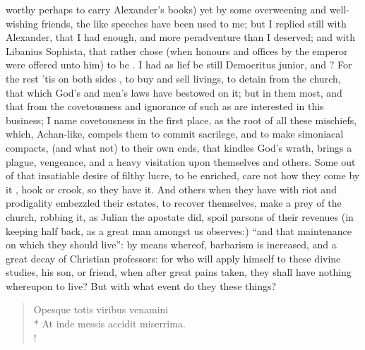 worthy perhaps to carry Alexander's books) yet by some overweening and
well-wishing friends, the like speeches have been used to me; but I replied
still with Alexander, that I had enough, and more peradventure than I deserved;
and with Libanius Sophista, that rather chose (when honours and offices by the
emperor were offered unto him) to be . I had as lief be still Democritus junior, and ? For the rest 'tis on both sides , to buy and sell livings, to detain from the church, that which
God's and men's laws have bestowed on it; but in them most, and that from the
covetousness and ignorance of such as are interested in this business; I name
covetousness in the first place, as the root of all these mischiefs, which,
Achan-like, compels them to commit sacrilege, and to make simoniacal compacts,
(and what not) to their own ends, that kindles God's
wrath, brings a plague, vengeance, and a heavy visitation upon themselves and
others. Some out of that insatiable desire of filthy lucre, to be enriched,
care not how they come by it , hook or crook, so they have
it. And others when they have with riot and prodigality embezzled their
estates, to recover themselves, make a prey of the church, robbing it, as
Julian the apostate did, spoil parsons of their revenues
(in keeping half back, as a great man amongst us
observes:) \enquote{and that maintenance on which they should live}: by means whereof,
barbarism is increased, and a great decay of Christian professors: for who will
apply himself to these divine studies, his son, or friend, when after great
pains taken, they shall have nothing whereupon to live? But with what event do
they these things?

\begin{latin}
\begin{verse}%
Opesque totis viribus venamini\\*
At inde messis accidit miserrima.\\!
\end{verse}%
\end{latin}

